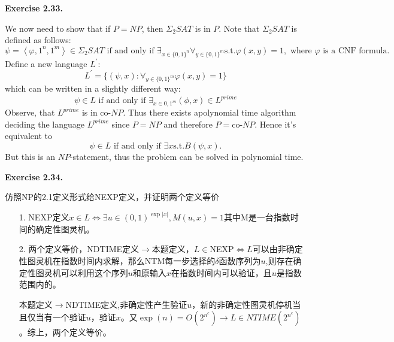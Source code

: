 \documentclass[a4paper]{article}
\newenvironment{exercise}[1]{
	\par
	\noindent\textbf{Exercise #1.}\quad
}{
	\par
	\bigskip
}
\begin{document}
\begin{exercise}{2.33}	
	We now need to show that if $P=NP$, then $\Sigma_2 SAT$ is in $P$. Note that $\Sigma_2 SAT$ is defined as follows:
	\begin{equation*}
	 \psi=\left\langle \varphi,1^{n},1^{m} \right\rangle \in  \Sigma_2 SAT  \text{   if and only if   } \exists_{x\in \{0,1\}^n} \forall_{y \in \{0,1 \}^m} \text{s.t.} \varphi(x,y)=1,\text{  where }\varphi \text{ is a CNF formula.} 
	\end{equation*}
	Define a new language $L^{\prime}$:
	\begin{equation*}
	     	L^{\prime}=\{(\psi,x): \forall_{y \in \{0,1\}^m} \varphi(x,y)=1\}
	\end{equation*}
	which can be written in a slightly different way:
	\begin{equation*}
		\psi \in L \text{  if and only if  } \exists_{x \in {0,1}^m} (\phi,x) \in L^{prime}
	\end{equation*}
	Observe, that $L^{prime}$ is in co-$NP$. Thus there exists apolynomial time algorithm deciding the language $L^{prime}$ since $P=NP$ and therefore $P=$co-$NP$. Hence it's equivalent to 
	\begin{equation*}
	       \psi \in L \text{  if and only if  } \exists x \text{s.t.} B(\psi,x). 
	\end{equation*}
	But this is an $NP$-statement, thus the problem can be solved in polynomial time.
\end{exercise}

	\begin{exercise}{2.34}
		仿照NP的2.1定义形式给NEXP定义，并证明两个定义等价
		\begin{itemize}
			\item [1.] NEXP定义$x\in L \iff\exists u\in (0,1)^{\exp|x|},M(u,x)=1$其中M是一台指数时间的确定性图灵机。
			\item [2.] 两个定义等价，NDTIME定义$\to$本题定义，$L\in $NEXP$\iff L$可以由非确定性图灵机在指数时间内求解，那么NTM每一步选择的$\delta$函数序列为$u$,则存在确定性图灵机可以利用这个序列$u$和原输入$x$在指数时间内可以验证，且$u$是指数范围内的。

				本题定义$\to$NDTIME定义,非确定性产生验证$u$，新的非确定性图灵机停机当且仅当有一个验证$u$，验证$x$。又$\exp(n) =O(2^{n^c})\to L\in NTIME(2^{n^c})$。综上，两个定义等价。
		\end{itemize}
	\end{exercise}
\end{document}
